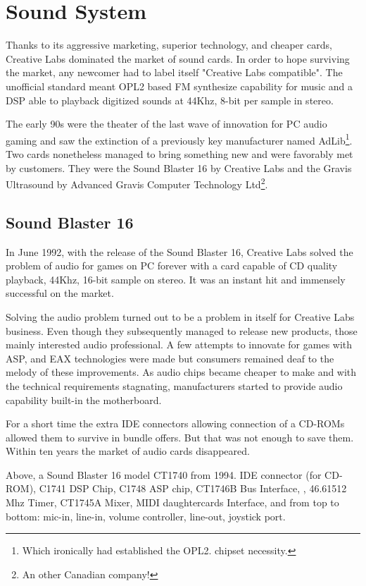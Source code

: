 \section{Sound System}
Thanks to its aggressive marketing, superior technology, and cheaper cards, Creative Labs dominated the market of sound cards. In order to hope surviving the market, any newcomer had to label itself "Creative Labs compatible". The unofficial standard meant OPL2 based FM synthesize capability for music and a DSP able to playback digitized sounds at 44Khz, 8-bit per sample in stereo.\\
\par
 The early 90s were the theater of the last wave of innovation for PC audio gaming and saw the extinction of a previously key manufacturer named AdLib\footnote{Which ironically had established the OPL2. chipset necessity.}. Two cards nonetheless managed to bring something new and were favorably met by customers. They were the Sound Blaster 16 by Creative Labs and the Gravis Ultrasound by Advanced Gravis Computer Technology Ltd\footnote{An other Canadian company!}.\\
\par
\subsection{Sound Blaster 16}
 In June 1992, with the release of the Sound Blaster 16, Creative Labs solved the problem of audio for games on PC forever with a card capable of CD quality playback, 44Khz, 16-bit sample on stereo. It was an instant hit and immensely successful on the market.\\
\par
{}
\par
Solving the audio problem turned out to be a problem in itself for Creative Labs business. Even though they subsequently managed to release new products, those mainly interested audio professional. A few attempts to innovate for games with ASP, and EAX technologies were made but consumers remained deaf to the melody of these improvements. As audio chips became cheaper to make and with the technical requirements stagnating, manufacturers started to provide audio capability built-in the motherboard.\\
\par
For a short time the extra IDE connectors allowing connection of a CD-ROMs allowed them to survive in bundle offers. But that was not enough to save them. Within ten years the market of audio cards disappeared.\\
\par
{}
\par
Above, a Sound Blaster 16 model CT1740 from 1994.  IDE connector (for CD-ROM),  C1741 DSP Chip,  C1748 ASP chip,  CT1746B Bus Interface, , 46.61512 Mhz Timer,  CT1745A Mixer,  MIDI daughtercards Interface, and  from top to bottom: mic-in, line-in, volume controller, line-out, joystick port.







